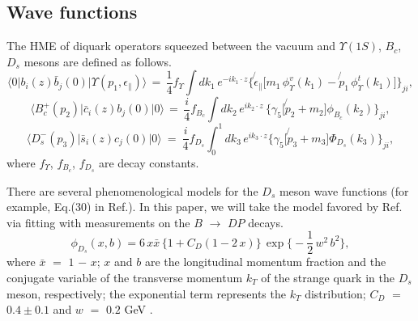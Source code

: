 \documentclass[preprint,superscriptaddress,nofootinbib]{revtex4}
\begin{document}
  \subsection{Wave functions}
  \label{sec0204}
  The HME of diquark operators squeezed
  between the vacuum and ${\Upsilon}(1S)$, $B_{c}$, $D_{s}$
  mesons are defined as follows.
  \begin{equation}
 {\langle}0{\vert}b_{i}(z)\bar{b}_{j}(0){\vert}
 {\Upsilon}(p_{1},{\epsilon}_{\parallel}){\rangle}\,
 =\, \frac{1}{4}f_{\Upsilon}
 {\int}dk_{1}\,e^{-ik_{1}{\cdot}z}
  \Big\{ \!\!\not{\epsilon}_{\parallel} \Big[
   m_{1}\,{\phi}_{\Upsilon}^{v}(k_{1})
  -\!\!\not{p}_{1}\, {\phi}_{\Upsilon}^{t}(k_{1})
  \Big] \Big\}_{ji}
  \label{wave-bbl},
  \end{equation}
  \begin{equation}
 {\langle}B_{c}^{+}(p_{2}){\vert}\bar{c}_{i}(z)b_{j}(0){\vert}0{\rangle}\,
 =\, \frac{i}{4}f_{B_{c}} {\int}dk_{2}\,e^{ik_{2}{\cdot}z}\,
  \Big\{ {\gamma}_{5}\Big[ \!\!\not{p}_{2}+m_{2}\Big]
 {\phi}_{B_{c}}(k_{2}) \Big\}_{ji}
  \label{wave-bcp},
  \end{equation}
  \begin{equation}
 {\langle}D_{s}^{-}(p_{3}){\vert}\bar{s}_{i}(z)c_{j}(0)
 {\vert}0{\rangle}\ =\
  \frac{i}{4}f_{D_{s}} {\int}_{0}^{1}dk_{3}\,e^{ik_{3}{\cdot}z}
  \Big\{ {\gamma}_{5}\Big[ \!\!\not{p}_{3}+m_{3}\Big]
 {\Phi}_{D_{s}}(k_{3}) \Big\}_{ji}
  \label{wave-ds},
  \end{equation}
  where $f_{\Upsilon}$, $f_{B_{c}}$, $f_{D_{s}}$ are
  decay constants.

  There are several phenomenological models for the $D_{s}$
  meson wave functions (for example, Eq.(30) in Ref.\cite{prd78lv}).
  In this paper, we will take the model favored by
  Ref.\cite{prd78lv} via fitting with measurements on
  the $B$ ${\to}$ $DP$ decays.
   \begin{equation}
  {\phi}_{D_{s}}(x,b)=6\,x\bar{x}\,
   \Big\{ 1+ C_{D}(1-2\,x) \Big\}\,
  {\exp}\Big\{ -\frac{1}{2}\,w^2\,b^2 \Big\}
   \label{DA-ds},
   \end{equation}
  where $\bar{x}$ $=$ $1$ $-$ $x$;
  $x$ and $b$ are the longitudinal momentum fraction
  and the conjugate variable of the transverse momentum $k_{T}$
  of the strange quark in the $D_{s}$ meson, respectively;
  the exponential term represents the $k_{T}$ distribution;
  $C_{D}$ $=$ $0.4{\pm}0.1$ and $w$ $=$ $0.2$ GeV \cite{prd78lv}.
\end{document}

